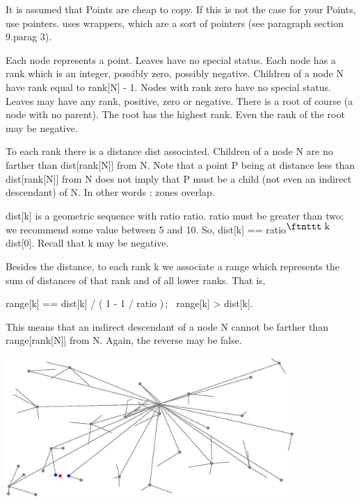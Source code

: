 {It is assumed that {\codett Point}s are cheap to copy.
If this is not the case for your {\codett Point}s, use pointers.
{\ManiFEM} uses wrappers, which are a sort of pointers (see paragraph
\numb section 9.\numb parag 3).

Each node represents a point.
Leaves have no special status.
Each node has a rank which is an integer, possibly zero, possibly negative.
Children of a node {\codett N} have rank equal to {\codett rank[N] - 1}.
Nodes with rank zero have no special status.
Leaves may have any rank, positive, zero or negative.
There is a {\codett root} of course (a node with no parent).
The root has the highest rank.
Even the rank of the root may be negative.

To each rank there is a distance {\codett dist} associated.
Children of a node {\codett N} are no farther than {\codett dist[rank[N]]} from {\codett N}.
Note that a point {\codett P} being at distance less than {\codett dist[rank[N]]} from
{\codett N} does not imply that {\codett P} must be a child (not even an indirect descendant)
of {\codett N}.
In other words : zones overlap.

{\codett dist[k]} is a geometric sequence with ratio {\codett ratio}.
{\codett ratio} must be greater than two; we recommend some value between 5 and 10.
So, {\codett dist[k] == ratio}$^{\hbox{\ftnttt k }}${\codett dist[0]}.
Recall that {\codett k} may be negative.

Besides the {\codett dist}ance, to each rank {\codett k} we associate a {\codett range}
which represents the sum of distances of that rank and of all lower ranks.
That is,
\smallskip\centerline
{{\codett range[k] == dist[k] / ( 1 - 1 / ratio )$\,$}; \ {\codett range[k] > dist[k]}.}
\smallskip\noindent
This means that an indirect descendant of a node {\codett N} cannot be farther than
{\codett range[rank[N]]} from {\codett N}.
Again, the reverse may be false.

\centerline{\includegraphics[width=110mm]{metric-tree.eps}}

}
